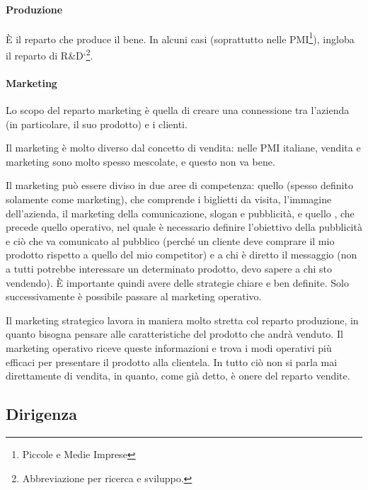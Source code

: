 \paragraph*{Produzione} È il reparto che produce il bene. In alcuni casi
(soprattutto nelle PMI\footnote{Piccole e Medie Imprese}), ingloba il
reparto di R\&D`\footnote{Abbreviazione per ricerca e sviluppo.}.

\paragraph*{Marketing}
\begin{definition}[Marketing]
Lo scopo del reparto marketing è quella di creare una connessione tra l'azienda
(in particolare, il suo prodotto) e i clienti.
\end{definition}

\noindent Il marketing è molto diverso dal concetto di vendita: nelle PMI
italiane, vendita e marketing sono molto spesso mescolate, e questo non va bene.

Il marketing può essere diviso in due aree di competenza: quello
 (spesso definito solamente come marketing), che comprende 
i biglietti da visita, l'immagine dell'azienda, il marketing della 
comunicazione, slogan e pubblicità, e quello , che 
precede quello operativo, nel quale è necessario definire l'obiettivo della 
pubblicità e ciò che va comunicato al pubblico (perché un cliente deve comprare 
il mio prodotto rispetto a quello del mio competitor) e a chi è diretto il 
messaggio (non a tutti potrebbe interessare un determinato prodotto, devo 
sapere a chi sto vendendo). È importante quindi avere delle strategie chiare e 
ben definite. Solo successivamente è possibile passare al marketing operativo.

Il marketing strategico lavora in maniera molto stretta col reparto produzione,
in quanto bisogna pensare alle caratteristiche del prodotto che andrà venduto.
Il marketing operativo riceve queste informazioni e trova i modi operativi più
efficaci per presentare il prodotto alla clientela. In tutto ciò non si parla
mai direttamente di vendita, in quanto, come già detto, è onere del reparto
vendite.

\subsection{Dirigenza}

